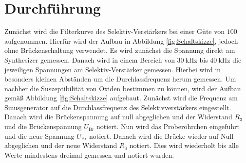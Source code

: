 
\section{Durchführung}
\label{sec:Durchführung}

Zunächst wird die Filterkurve des Selektiv-Verstärkers bei einer Güte von $100$ aufgenommen. Hierfür wird der Aufbau in Abbildung \ref{fig:Schaltskizze}, jedoch ohne Brückenschaltung verwendet. Es wird zunächst die Spannung direkt am Synthesizer gemessen. Danach wird in einem Bereich von $\SI{30}{\kilo\hertz}$ bis $\SI{40}{\kilo\hertz}$ die jeweiligen Spannungen am Selektiv-Verstärker gemessen. Hierbei wird in besonders kleinen Abständen um die Durchlassfrequenz herum gemessen. Um nachher die Suszeptibilität von Oxiden bestimmen zu können, wird der Aufbau gemäß Abbildung \ref{fig:Schaltskizze} aufgebaut. Zunächst wird die Frequenz am Sinusgenerator auf die Durchlassfrequenz des Selektivverstärkers eingestellt. Danach wird die Brückenspannung auf null abgeglichen und der Widerstand $R_3$ und die Brückenspannung $U_\text{Br}$ notiert. Nun wird das Proberöhrchen eingeführt und die neue Spannung $U_\text{Br}$ notiert. Danach wird die Brücke wieder auf Null abgeglichen und der neue Widerstand $R_3$ notiert. Dies wird wiederholt bis alle Werte mindestens dreimal gemessen und notiert wurden. 